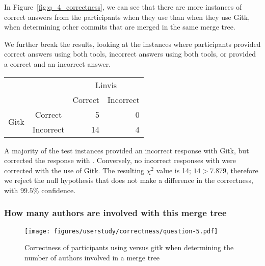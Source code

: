 In Figure~\ref{fig:q_4_correctness}, we can see that there are more
instances of correct answers from the participants when they use \tool
than when they use Gitk, when determining other commits that are merged
in the same merge tree.

We further break the results, looking at the instances where
participants provided correct answers using both tools, incorrect
answers using both tools, or provided a correct and an incorrect answer.




\begin{center}
  \begin{tabular}{cc|rr}
                           &           & \multicolumn{2}{c}{Linvis}\\
                           &           & Correct                      & Incorrect\\\hline
    \multirow{2}{*}{Gitk}  & Correct   & 5                            & 0\\
                           & Incorrect & 14                           & 4\\
  \end{tabular}
\end{center}

A majority of the test instances provided an incorrect response with
Gitk, but corrected the response with \tool. Conversely, no incorrect
responses with \tool were corrected with the use of Gitk. The resulting
$\chi^2$ value is 14; $14 > 7.879$, therefore we reject the null
hypothesis that \tool does not make a difference in the correctness,
with $99.5\%$ confidence.

\subsubsection{How many authors are involved with this merge tree}
\label{ssub:how_many_authors_are_involved_with_this_merge_tree}

\begin{figure}[htpb]
  \centering
  \texttt{[image: figures/userstudy/correctness/question-5.pdf]}
  \caption{Correctness of participants using \tool versus gitk when
    determining the number of authors involved in a merge tree}
  \label{fig:q_5_correctness}
\end{figure}

